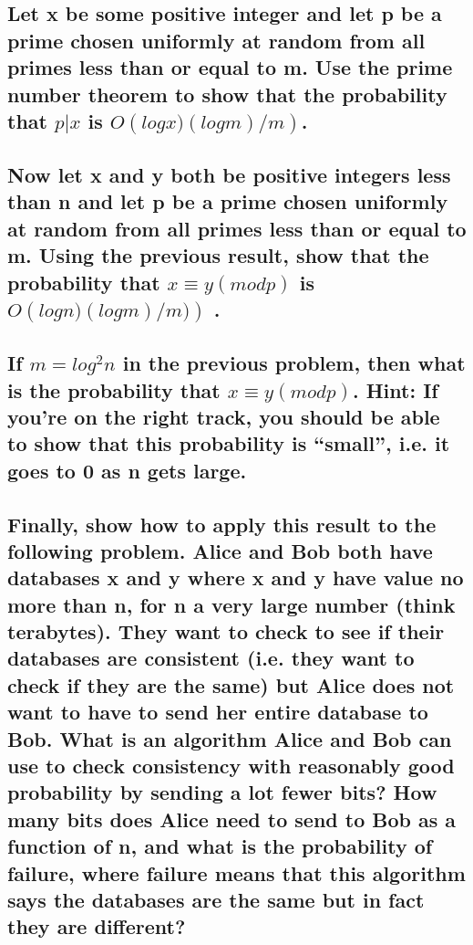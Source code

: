 \documentclass[titlepage]{article}\usepackage[]{graphicx}\usepackage[]{color}
\begin{document}
\subsection{ Let x be some positive integer and let p be a prime chosen uniformly at
random from all primes less than or equal to m. Use the prime number theorem to
show that the probability that $p|x$ is $O\left( log x)(log m)/m\right)$. }

\subsection{ Now let x and y both be positive integers less than n and let p be a prime
chosen uniformly at random from all primes less than or equal to m. Using the
previous result, show that the probability that $ x ≡ y (mod p)$  is $ O\left( log
n)(log m)/m)\right)$ . }

\subsection{ If $ m = log^2 n$  in the previous problem, then what is the probability that
$x ≡ y (mod p)$. Hint: If you're on the right track, you should be able to show
that this probability is ``small'', i.e. it goes to 0 as n gets large. }

\subsection{ Finally, show how to apply this result to the following problem. Alice and
Bob both have databases x and y where x and y have value no more than n, for n
a very large number (think terabytes). They want to check to see if their
databases are consistent (i.e. they want to check if they are the same) but
Alice does not want to have to send her entire database to Bob. What is an
algorithm Alice and Bob can use to check consistency with reasonably good
probability by sending a lot fewer bits? How many bits does Alice need to send
to Bob as a function of n, and what is the probability of failure, where
failure means that this algorithm says the databases are the same but in fact
they are different? }
\end{document}
